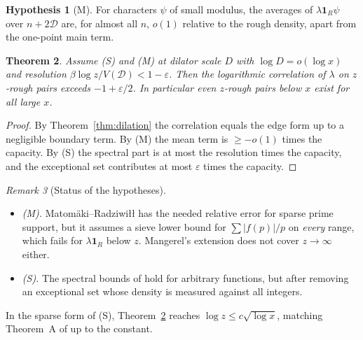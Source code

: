 \documentclass[11pt]{amsart}
\newtheorem{theorem}{Theorem}[section]
\theoremstyle{definition}
\newtheorem{hypothesis}[theorem]{Hypothesis}
\theoremstyle{remark}
\newtheorem{remark}[theorem]{Remark}
\newcommand{\one}{\mathbf 1}
\newcommand{\cD}{\mathcal D}
\begin{document}
\begin{hypothesis}[M]
For characters $\psi$ of small modulus, the averages of $\lambda\one_R\psi$ over $n+2\cD$ are, for almost all $n$, $o(1)$ relative to the rough density, apart from the one-point main term.
\end{hypothesis}

\begin{theorem}\label{thm:conditional}
Assume (S) and (M) at dilator scale $D$ with $\log D=o(\log x)$ and resolution $\beta\log z/V(\cD)<1-\varepsilon$. Then the logarithmic correlation of $\lambda$ on $z$-rough pairs exceeds $-1+\varepsilon/2$. In particular even $z$-rough pairs below $x$ exist for all large $x$.
\end{theorem}
\begin{proof}
By Theorem~\ref{thm:dilation} the correlation equals the edge form up to a negligible boundary term. By (M) the mean term is $\ge-o(1)$ times the capacity. By (S) the spectral part is at most the resolution times the capacity, and the exceptional set contributes at most $\varepsilon$ times the capacity.
\end{proof}

\begin{remark}[Status of the hypotheses]
\begin{itemize}
\item \emph{(M).} Matom\"aki--Radziwi\l{}\l{} \cite[Thm.~1.9]{MR16} has the needed relative error for sparse prime support, but it assumes a sieve lower bound for $\sum|f(p)|/p$ on \emph{every} range, which fails for $\lambda\one_R$ below $z$. Mangerel's extension \cite{Man21} does not cover $z\to\infty$ either.
\item \emph{(S).} The spectral bounds of \cite{HR21,Pil23} hold for arbitrary functions, but after removing an exceptional set whose density is measured against all integers.
\end{itemize}
In the sparse form of (S), Theorem~\ref{thm:conditional} reaches $\log z\le c\sqrt{\log x}$, matching Theorem~A of \cite{Wan26b} up to the constant.
\end{remark}
\end{document}
